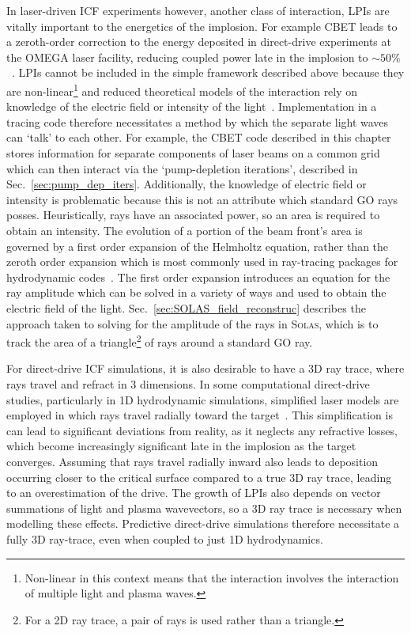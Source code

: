 In laser-driven \ac{ICF} experiments however, another class of interaction, \ac{LPIs} are vitally important to the energetics of the implosion.
For example \ac{CBET} leads to a zeroth-order correction to the energy deposited in direct-drive experiments at the OMEGA laser facility, reducing coupled power late in the implosion to $\sim 50\%$~\cite{colaitis_inverse_2021}.
\ac{LPIs} cannot be included in the simple framework described above because they are non-linear\footnote{Non-linear in this context means that the interaction involves the interaction of multiple light and plasma waves.} and reduced theoretical models of the interaction rely on knowledge of the electric field or intensity of the light~\cite{randall_theory_1981}.
Implementation in a tracing code therefore necessitates a method by which the separate light waves can `talk' to each other.
For example, the \ac{CBET} code described in this chapter stores information for separate components of laser beams on a common grid which can then interact via the `pump-depletion iterations', described in Sec.~\ref{sec:pump_dep_iters}.
Additionally, the knowledge of electric field or intensity is problematic because this is not an attribute which standard \ac{GO} rays posses.
Heuristically, rays have an associated power, so an area is required to obtain an intensity.
The evolution of a portion of the beam front's area is governed by a first order expansion of the Helmholtz equation, rather than the zeroth order expansion which is most commonly used in ray-tracing packages for hydrodynamic codes~\cite{colaitis_towards_2014}.
The first order expansion introduces an equation for the ray amplitude which can be solved in a variety of ways and used to obtain the electric field of the light.
Sec.~\ref{sec:SOLAS_field_reconstruc} describes the approach taken to solving for the amplitude of the rays in \textsc{Solas}, which is to track the area of a triangle\footnote{For a 2D ray trace, a pair of rays is used rather than a triangle.} of rays around a standard \ac{GO} ray.

For direct-drive \ac{ICF} simulations, it is also desirable to have a 3D ray trace, where rays travel and refract in 3 dimensions.
In some computational direct-drive studies, particularly in 1D hydrodynamic simulations, simplified laser models are employed in which rays travel radially toward the target~\cite{paddock_one-dimensional_2021}.
This simplification is can lead to significant deviations from reality, as it neglects any refractive losses, which become increasingly significant late in the implosion as the target converges.
Assuming that rays travel radially inward also leads to deposition occurring closer to the critical surface compared to a true 3D ray trace, leading to an overestimation of the drive.
The growth of \ac{LPIs} also depends on vector summations of light and plasma wavevectors, so a 3D ray trace is necessary when modelling these effects.
Predictive direct-drive simulations therefore necessitate a fully 3D ray-trace, even when coupled to just 1D hydrodynamics.


